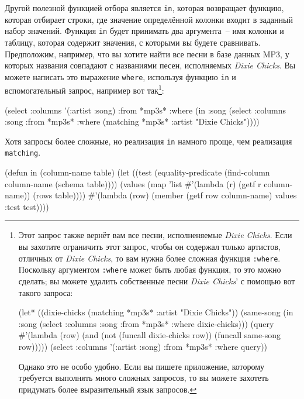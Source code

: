 Другой полезной функцией отбора является \lstinline{in}, которая возвращает функцию, которая
отбирает строки, где значение определённой колонки входит в заданный набор значений.
Функция \lstinline{in} будет принимать два аргумента~-- имя колонки и таблицу, которая
содержит значения, с которыми вы будете сравнивать.  Предположим, например, что вы хотите
найти все песни в базе данных MP3, у которых названия совпадают с названиями песен,
исполняемых \textit{Dixie Chicks}.  Вы можете написать это выражение \lstinline{where},
используя функцию \lstinline{in} и вспомогательный запрос, например вот так\footnote{Этот
  запрос также вернёт вам все песни, исполненяемые \textit{Dixie Chicks}.  Если вы захотите
  ограничить этот запрос, чтобы он содержал только артистов, отличных от \textit{Dixie
    Chicks}, то вам нужна более сложная функция \lstinline{:where}.  Поскольку аргументом
  \lstinline{:where} может быть любая функция, то это можно сделать; вы можете удалить
  собственные песни \textit{Dixie Chicks}' с помощью вот такого запроса:

\begin{myverb}
(let* ((dixie-chicks (matching *mp3s* :artist "Dixie Chicks"))
       (same-song (in :song (select :columns :song :from *mp3s* :where dixie-chicks)))
       (query #'(lambda (row) (and (not (funcall dixie-chicks row)) 
                                   (funcall same-song row)))))
  (select :columns '(:artist :song) :from *mp3s* :where query))
\end{myverb}

Однако это не особо удобно.  Если вы пишете приложение, которому требуется выполнять много
сложных запросов, то вы можете захотеть придумать более выразительный язык запросов.}\hspace{\footnotenegspace}:

\begin{myverb}
(select
  :columns '(:artist :song)
  :from *mp3s*
  :where (in :song 
             (select
               :columns :song
               :from *mp3s*
               :where (matching *mp3s* :artist "Dixie Chicks"))))
\end{myverb}

Хотя запросы более сложные, но реализация \lstinline{in} намного проще, чем реализация
\lstinline{matching}.

\begin{myverb}
(defun in (column-name table)
  (let ((test (equality-predicate (find-column column-name (schema table))))
        (values (map 'list #'(lambda (r) (getf r column-name)) (rows table))))
    #'(lambda (row)
        (member (getf row column-name) values :test test))))
\end{myverb}

